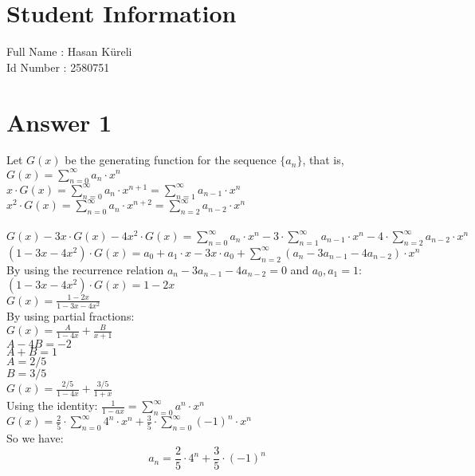 \documentclass[12pt]{article}
\begin{document}
\section*{Student Information } 
Full Name :  Hasan Küreli\\
Id Number :  2580751\\

\section*{Answer 1}
Let $G(x)$ be the generating function for the sequence $\{a_n\}$, that is, $G(x)= \sum_{n=0}^{\infty} a_n \cdot x^n $ \\
$x \cdot G(x) = \sum_{n=0}^{\infty} a_n \cdot x^{n+1} = \sum_{n=1}^{\infty} a_{n-1} \cdot x^n$\\
$x^2 \cdot G(x) = \sum_{n=0}^{\infty} a_n \cdot x^{n+2} = \sum_{n=2}^{\infty} a_{n-2} \cdot x^n$\\\\
$G(x) - 3 x\cdot G(x) - 4x^2 \cdot G(x) = \sum_{n=0}^{\infty} a_n \cdot x^{n} - 3\cdot \sum_{n=1}^{\infty} a_{n-1} \cdot x^{n} -4\cdot \sum_{n=2}^{\infty} a_{n-2} \cdot x^{n}$\\
$(1- 3x -4x^2)\cdot G(x) = a_0 + a_1 \cdot x -3 x \cdot a_0 + \sum_{n=2}^{\infty} (a_n - 3a_{n-1} - 4a_{n-2}) \cdot x^{n} $\\
By using the recurrence relation $a_n - 3a_{n-1} - 4a_{n-2} = 0$ and $a_0,a_1=1$:\\
$(1- 3x -4x^2)\cdot G(x) = 1 - 2x$\\
$G(x) = \frac{1-2x}{1- 3x -4x^2}$\\
By using partial fractions:\\
$G(x) = \frac{A}{1-4x} + \frac{B}{x+1}$\\
$A - 4B = -2$\\
$A+B = 1$\\
$A= 2/5$\\
$B=3/5$\\
$G(x) = \frac{2/5}{1-4x} + \frac{3/5}{1+x} $\\
Using the identity: 
$\frac{1}{1-ax} =\sum_{n=0}^{\infty} a^n \cdot x^n $\\
$G(x)= \frac{2}{5}\cdot \sum_{n=0}^{\infty} 4^n \cdot x^n + \frac{3}{5} \cdot \sum_{n=0}^{\infty} (-1)^n \cdot x^n$\\
So we have:\\
$$a_n = \frac{2}{5}\cdot 4^n + \frac{3}{5} \cdot (-1)^n$$
\end{document}
